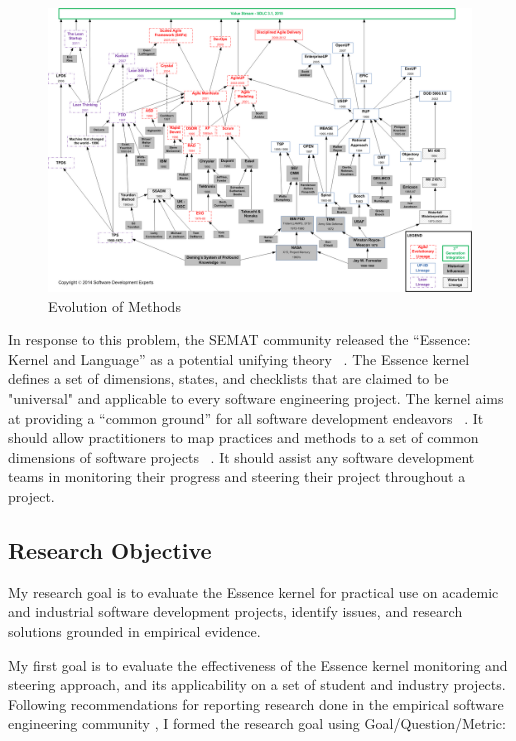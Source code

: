 \documentclass[preprint,12pt,3p]{elsarticle}
\begin{document}
\begin{figure}[h]\vspace*{4pt}
\centerline{\includegraphics[width=6.4in]{field_study_images/ModernSoftwareEngineeringHistory}}
\caption{Evolution of Methods}\vspace*{-6pt}\label{ModernSoftwareEngineeringHistory}
\end{figure}

In response to this problem, the SEMAT community released the “Essence: Kernel and Language” as a potential unifying theory  ~\cite{OMGStandard}. The Essence kernel defines a set of dimensions, states, and checklists that are claimed to be "universal" and applicable to every software engineering project. The kernel aims at providing a “common ground” for all software development endeavors ~\cite{JacobsonQueue}. It should allow practitioners to map practices and methods to a set of common dimensions of software projects ~\cite{JacobsonQueue}.  It should assist any software development teams in monitoring their progress and steering their project throughout a project.

\subsection{Research Objective}
My research goal is to evaluate the Essence kernel for practical use on academic and industrial software development projects, identify issues, and research solutions grounded in empirical evidence.

My first goal is to evaluate the effectiveness of the Essence kernel monitoring and steering approach, and its applicability on a set of student and industry projects. Following recommendations for reporting research done in the empirical
software engineering community
\cite{GQM, Shaw}, I formed the
research goal using Goal/Question/Metric:
\cite{GQM}
\end{document}
